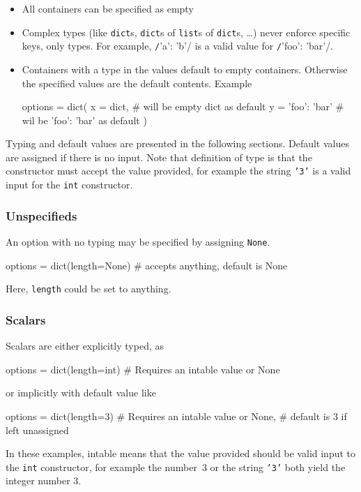 \begin{itemize}
\item All containers can be specified as empty 

\item Complex types (like \texttt{dict}s, \texttt{dict}s of
  \texttt{list}s of \texttt{dict}s, \dots) never enforce specific
  keys, only types.  For example, \texttt/{'a': 'b'}/ is a
  valid value for \texttt/{'foo': 'bar'}/. 

\item Containers with a type in the values default to empty containers.
  Otherwise the specified values are the default contents.  Example
  \begin{python}
options = dict(
    x = dict,           # will be empty dict as default
    y = {'foo': 'bar'}  # wil be {'foo': 'bar'} as default
)
  \end{python}
\end{itemize}

Typing and default values are presented in the following sections.
Default values are assigned if there is no input.  Note that
definition of type is that the constructor must accept the value
provided, for example the string \texttt{'3'} is a valid input for the
\texttt{int} constructor.


\subsubsection{Unspecifieds}
An option with no typing may be specified by assigning \texttt{None}.
\begin{python}
options = dict(length=None)  # accepts anything, default is None
\end{python}
Here, \texttt{length} could be set to anything.



\subsubsection*{Scalars}
Scalars are either explicitly typed, as
\begin{python}
options = dict(length=int)   # Requires an intable value or None
\end{python}
or implicitly with default value like
\begin{python}
options = dict(length=3)     # Requires an intable value or None,
                             # default is 3 if left unassigned
\end{python}
In these examples, intable means that the value provided should be
valid input to the \texttt{int} constructor, for example the number~3
or the string \texttt{'3'} both yield the integer number 3.



